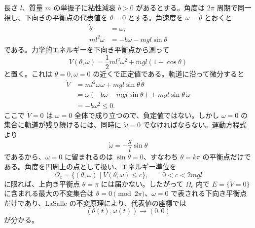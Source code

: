\begin{example}[粘性減衰をもつ単振子]
長さ $l$、質量 $m$ の単振子に粘性減衰 $b>0$ があるとする。角度は $2\pi$ 周期で同一視し、下向きの平衡点の代表値を $\theta=0$ とする。角速度を $\omega=\dot{\theta}$ とおくと
\begin{align}
  \dot{\theta}&=\omega,\\
  ml^2\dot{\omega}&=-b\omega-mgl\sin\theta
\end{align}
である。力学的エネルギーを下向き平衡点から測って
\begin{equation}
  V(\theta,\omega)
  =\frac{1}{2}ml^2\omega^2+mgl(1-\cos\theta)
\end{equation}
と置く。これは $\theta=0,\omega=0$ の近くで正定値である。軌道に沿って微分すると
\begin{align}
  \dot{V}
  &=ml^2\omega\dot{\omega}+mgl\sin\theta\,\dot{\theta}\\
  &=\omega(-b\omega-mgl\sin\theta)+mgl\sin\theta\,\omega\\
  &=-b\omega^2\le0.
\end{align}
ここで $\dot{V}=0$ は $\omega=0$ 全体で成り立つので、負定値ではない。しかし $\omega=0$ の集合に軌道が残り続けるには、同時に $\dot{\omega}=0$ でなければならない。運動方程式より
\begin{equation}
  \dot{\omega}=-\frac{g}{l}\sin\theta
\end{equation}
であるから、$\omega=0$ に留まれるのは $\sin\theta=0$、すなわち $\theta=k\pi$ の平衡点だけである。角度を円周上の点として扱い、エネルギー準位を
\begin{equation}
  \Omega_c=\{(\theta,\omega)\mid V(\theta,\omega)\le c\},\qquad 0<c<2mgl
\end{equation}
に限れば、上向き平衡点 $\theta=\pi$ には届かない。したがって $\Omega_c$ 内で $E=\{\dot{V}=0\}$ に含まれる最大の不変集合は $\theta=0\pmod{2\pi}$、$\omega=0$ で表される下向き平衡点だけであり、LaSalle の不変原理により、代表値の座標では
\begin{equation}
  (\theta(t),\omega(t))\to(0,0)
\end{equation}
が分かる。


\end{example}
